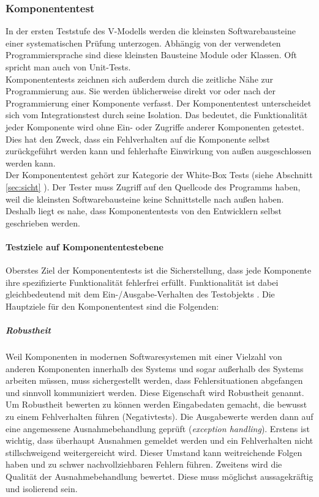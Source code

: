 \subsubsection{Komponententest}
\label{sec:unit_test}
In der ersten Teststufe des V-Modells werden die kleinsten Softwarebausteine einer systematischen Prüfung unterzogen. Abhängig von der verwendeten Programmiersprache sind diese kleinsten Bausteine Module oder Klassen. Oft spricht man auch von \Glspl{Unit-Test}.\\
Komponententests zeichnen sich außerdem durch die zeitliche Nähe zur Programmierung aus. Sie werden üblicherweise direkt vor oder nach der Programmierung einer Komponente verfasst. Der Komponententest unterscheidet sich vom Integrationstest durch seine Isolation. Das bedeutet, die Funktionalität jeder Komponente wird ohne Ein- oder Zugriffe anderer Komponenten getestet. Dies hat den Zweck, dass ein Fehlverhalten auf die Komponente selbst zurückgeführt werden kann und fehlerhafte Einwirkung von außen ausgeschlossen werden kann.\\
Der Komponententest gehört zur Kategorie der White-Box Tests (siehe Abschnitt \ref{sec:sicht} ). Der Tester muss Zugriff auf den Quellcode des Programms haben, weil die kleinsten Softwarebausteine keine Schnittstelle nach außen haben. Deshalb liegt es nahe, dass Komponententests von den Entwicklern selbst geschrieben werden.

\paragraph{Testziele auf Komponententestebene}
Oberstes Ziel der Komponententests ist die Sicherstellung, dass jede Komponente ihre spezifizierte Funktionalität fehlerfrei erfüllt. Funktionalität ist dabei gleichbedeutend mit dem Ein-/Ausgabe-Verhalten des Testobjekts \cite{spillner_basiswissen_2012}. Die Hauptziele für den Komponententest sind die Folgenden:\\

\subparagraph{Robustheit} Weil Komponenten in modernen Softwaresystemen mit einer Vielzahl von anderen Komponenten innerhalb des Systems und sogar außerhalb des Systems arbeiten müssen, muss sichergestellt werden, dass Fehlersituationen abgefangen und sinnvoll kommuniziert werden. Diese Eigenschaft wird Robustheit genannt. Um Robustheit bewerten zu können werden Eingabedaten gemacht, die bewusst zu einem Fehlverhalten führen (Negativtests). Die Ausgabewerte werden dann auf eine angemessene Ausnahmebehandlung geprüft (\textit{exception handling}). Erstens ist wichtig, dass überhaupt Ausnahmen gemeldet werden und ein Fehlverhalten nicht stillschweigend weitergereicht wird. Dieser Umstand kann weitreichende Folgen haben und zu schwer nachvollziehbaren Fehlern führen. Zweitens wird die Qualität der Ausnahmebehandlung bewertet. Diese muss möglichst aussagekräftig und isolierend sein.


